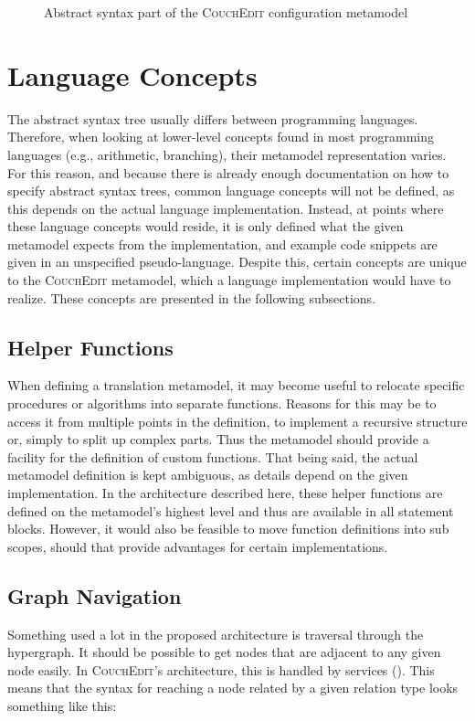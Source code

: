 \begin{figure}
  \centering
  
  \caption{Abstract syntax part of the \textsc{CouchEdit} configuration metamodel}
  \label{fig:csd-abstractsyntax}
\end{figure}


\section{Language Concepts}
\label{sec:language-concepts}
The abstract syntax tree usually differs between programming languages. Therefore, when looking at lower-level concepts found in most programming languages (e.g., arithmetic, branching), their metamodel representation varies. For this reason, and because there is already enough documentation on how to specify abstract syntax trees, common language concepts will not be defined, as this depends on the actual language implementation. Instead, at points where these language concepts would reside, it is only defined what the given metamodel expects from the implementation, and example code snippets are given in an unspecified pseudo-language. Despite this, certain concepts are unique to the \textsc{CouchEdit} metamodel, which a language implementation would have to realize. These concepts are presented in the following subsections.


\subsection{Helper Functions}
When defining a translation metamodel, it may become useful to relocate specific procedures or algorithms into separate functions. Reasons for this may be to access it from multiple points in the definition, to implement a recursive structure or, simply to split up complex parts. Thus the metamodel should provide a facility for the definition of custom functions. That being said, the actual metamodel definition is kept ambiguous, as details depend on the given implementation. In the architecture described here, these helper functions are defined on the metamodel's highest level and thus are available in all statement blocks. However, it would also be feasible to move function definitions into sub scopes, should that provide advantages for certain implementations.

\subsection{Graph Navigation}
\label{sec:abstraction}
Something used a lot in the proposed architecture is traversal through the hypergraph. It should be possible to get nodes that are adjacent to any given node easily. In \textsc{CouchEdit}'s architecture, this is handled by services (). This means that the syntax for reaching a node related by a given relation type looks something like this:

